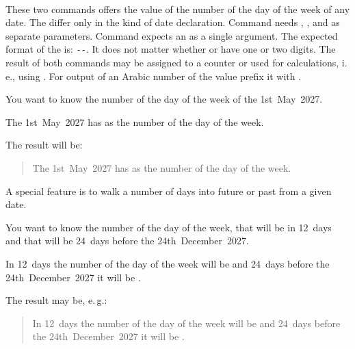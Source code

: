 \begin{Declaration}
  \\%
\end{Declaration}%
%
%
These two commands offers the value of
the number of the day of the week of any date. The
differ only in the kind of date declaration. Command  needs
, , and  as separate parameters. Command
 expects an  as a single argument. The
expected format of the  is:
\texttt{-}\texttt{-}. It does not matter
whether  or  have one or two digits. The result of
both commands may be assigned to a counter or used for calculations, i.\,e.,
using . For output of
an Arabic number of the value prefix it with .

\begin{Example}
  You want to know the number of the day of the week of the 1st~May~2027.
\begin{lstcode}
  The 1st~May~2027 has \the{}
  as the number of the day of the week.
\end{lstcode}
  The result will be:
  \begin{quote}
    The 1st~May~2027 has \the{}
    as the number of the day of the week.
  \end{quote}
\end{Example}

A special feature is to walk a number of days into future or past from a given
date.
\begin{Example}
  You want to know the number of the day of the week, that will be in 12~days
  and that will be 24~days before the 24th~December~2027.
\begin{lstcode}
  In 12~days the number of the day of the week
  will be \the{} and
  24~days before the 24th~December~2027 it will be
  \the{}.
\end{lstcode}
  The result may be, e.\,g.:
  \begin{quote}
    In 12~days the number of the day of the week
    will be \the{} and
    24~days before the 24th~December~2027 it will be
    \the{}.
  \end{quote}
\end{Example}


